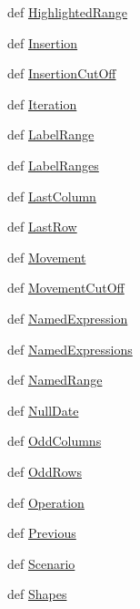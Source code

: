 \begin{DoxyCompactItemize}
\item 
def \hyperlink{namespaceodf_1_1table_add9eb6941904f16b35056a7aff69eb62}{Highlighted\+Range}
\item 
def \hyperlink{namespaceodf_1_1table_a868ba78deff612f56748926b6c4a729b}{Insertion}
\item 
def \hyperlink{namespaceodf_1_1table_ac852f8cca0ac06487bb49ba7c7022d08}{Insertion\+Cut\+Off}
\item 
def \hyperlink{namespaceodf_1_1table_a13f703be8d5303a7b6f91439771ecfb4}{Iteration}
\item 
def \hyperlink{namespaceodf_1_1table_ae46f447b780d91e24e7ec22e4778c19e}{Label\+Range}
\item 
def \hyperlink{namespaceodf_1_1table_a44f771448351f3beb31898a09205126f}{Label\+Ranges}
\item 
def \hyperlink{namespaceodf_1_1table_a48dce29d67045d19cefffc2696a6a728}{Last\+Column}
\item 
def \hyperlink{namespaceodf_1_1table_a1b432275bd4d8a578902438ccfd5976f}{Last\+Row}
\item 
def \hyperlink{namespaceodf_1_1table_ac369946eaac5104f700207c035f18d9e}{Movement}
\item 
def \hyperlink{namespaceodf_1_1table_a30f9304448b4b3f12141cb3825278732}{Movement\+Cut\+Off}
\item 
def \hyperlink{namespaceodf_1_1table_a6b5ae300cf69b37989f225494b8f4813}{Named\+Expression}
\item 
def \hyperlink{namespaceodf_1_1table_ae7edd61c74bd06edd9c38fef5a5d74fe}{Named\+Expressions}
\item 
def \hyperlink{namespaceodf_1_1table_acfa7a4dcd34bde11ecae8d2f17c2f8c1}{Named\+Range}
\item 
def \hyperlink{namespaceodf_1_1table_ad66569cc09ef58f51d303600f27f6dd0}{Null\+Date}
\item 
def \hyperlink{namespaceodf_1_1table_a59cec6241a15b04cb707527e72befb0d}{Odd\+Columns}
\item 
def \hyperlink{namespaceodf_1_1table_af0bad0cebb0279730496da932797ea68}{Odd\+Rows}
\item 
def \hyperlink{namespaceodf_1_1table_acb68caef48c42ca5ed83027f55cf3632}{Operation}
\item 
def \hyperlink{namespaceodf_1_1table_a884732e82e7b128a274c96f547595fb9}{Previous}
\item 
def \hyperlink{namespaceodf_1_1table_a5c5b31af6a187b79ce64cd8ce058dd4e}{Scenario}
\item 
def \hyperlink{namespaceodf_1_1table_a68e631eb751522b8785850f875ab0888}{Shapes}

\end{DoxyCompactItemize}
